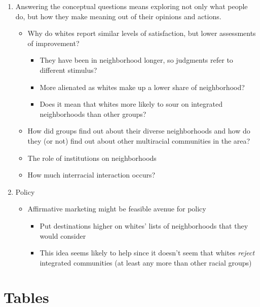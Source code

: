 \documentclass{baderart}
\begin{document}
\begin{enumerate}
\item Answering the conceptual questions means exploring not only what people do, but how they make meaning out of their opinions and actions. 
\begin{itemize}
\item Why do whites report similar levels of satisfaction, but lower assessments of improvement?
\begin{itemize}
\item They have been in neighborhood longer, so judgments refer to different stimulus?
\item More alienated as whites make up a lower share of neighborhood? 
\item Does it mean that whites more likely to sour on integrated neighborhoods than other groups?
\end{itemize}

\item How did groups find out about their diverse neighborhoods and how do they (or not) find out about other multiracial communities in the area? 

\item The role of institutions on neighborhoods

\item How much interracial interaction occurs? 
\end{itemize}

\item Policy
\begin{itemize}
\item Affirmative marketing might be feasible avenue for policy
\begin{itemize}
\item Put destinations higher on whites' lists of neighborhoods that they would consider
\item This idea seems likely to help since it doesn't seem that whites \emph{reject} integrated communities (at least any more than other racial groups)
\end{itemize}
\end{itemize}
\end{enumerate}

\clearpage


\section{Tables}


\end{document}
